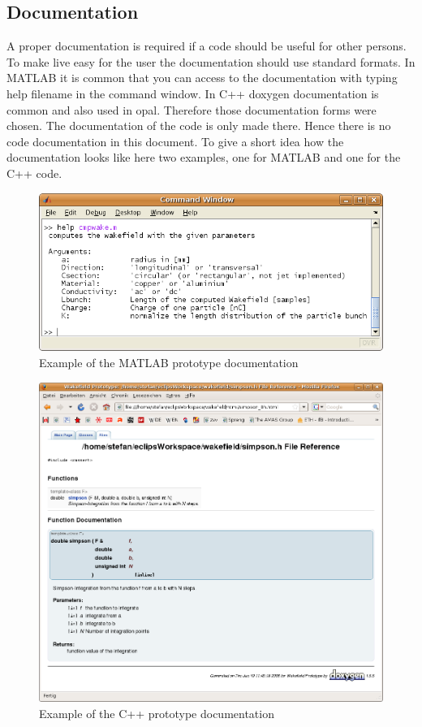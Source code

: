 \documentclass[11pt,a4paper]{article}
\begin{document}
\subsection{Documentation}
A proper documentation is required if a code should be useful for other persons. To make live easy for the user the documentation should use standard formats. In MATLAB it is common that you can access to the documentation with typing help filename in the command window. In C++ doxygen documentation is common and also used in opal. Therefore those documentation forms were chosen. The documentation of the code is only made there. Hence there is no code documentation in this document. To give a short idea how the documentation looks like here two examples, one for MATLAB and one for the C++ code.
 \begin{figure}[htb]
\begin{center}
\includegraphics[width=1\textwidth]{codDoc/mat_doc.png}
\caption{Example of the MATLAB prototype documentation \label{fig:mat_doc} }
\end{center}
\end{figure}
\begin{figure}[htb]
\begin{center}
\includegraphics[width=1\textwidth]{codDoc/cpp_doc.png}
\caption{Example of the C++ prototype documentation \label{fig:cpp_doc} }
\end{center}
\end{figure}
\end{document}
